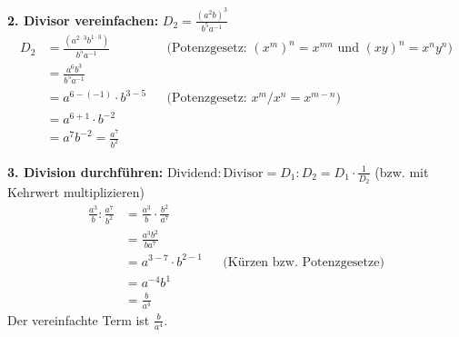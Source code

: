 \textbf{2. Divisor vereinfachen:} $D_2 = \frac{(a^2b)^3}{b^5 a^{-1}}$
\begin{align*} D_2 &= \frac{(a^{2\cdot3}b^{1\cdot3})}{b^5 a^{-1}} && \text{(Potenzgesetz: $(x^m)^n = x^{mn}$ und $(xy)^n = x^n y^n$)} \\ &= \frac{a^6 b^3}{b^5 a^{-1}} \\ &= a^{6-(-1)} \cdot b^{3-5} && \text{(Potenzgesetz: $x^m/x^n = x^{m-n}$)} \\ &= a^{6+1} \cdot b^{-2} \\ &= a^7 b^{-2} = \frac{a^7}{b^2} \end{align*}

\textbf{3. Division durchführen:} $\text{Dividend} : \text{Divisor} = D_1 : D_2 = D_1 \cdot \frac{1}{D_2}$ (bzw. mit Kehrwert multiplizieren)
\begin{align*} \frac{a^3}{b} : \frac{a^7}{b^2} &= \frac{a^3}{b} \cdot \frac{b^2}{a^7} \\ &= \frac{a^3 b^2}{b a^7} \\ &= a^{3-7} \cdot b^{2-1} && \text{(Kürzen bzw. Potenzgesetze)} \\ &= a^{-4} b^1 \\ &= \frac{b}{a^4} \end{align*}
Der vereinfachte Term ist $\frac{b}{a^4}$.